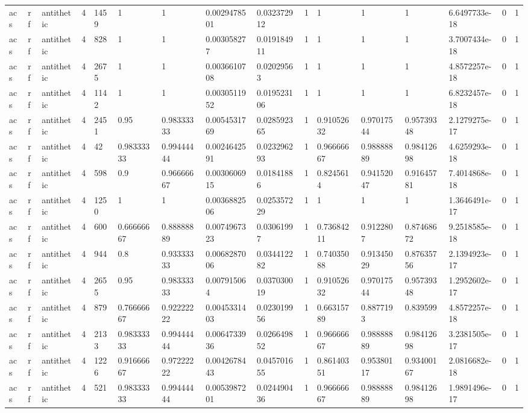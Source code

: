 \begin{tabular}{llllllllllllllll}
acs & rf & antithetic & 4 & 1459 & 1 & 1 & 0.0029478501 & 0.032372912 & 1 & 1 & 1 & 1 & 6.6497733e-18 & 0 & 1 \\
acs & rf & antithetic & 4 & 828 & 1 & 1 & 0.003058277 & 0.019184911 & 1 & 1 & 1 & 1 & 3.7007434e-18 & 0 & 1 \\
acs & rf & antithetic & 4 & 2675 & 1 & 1 & 0.0036610708 & 0.02029563 & 1 & 1 & 1 & 1 & 4.8572257e-18 & 0 & 1 \\
acs & rf & antithetic & 4 & 1142 & 1 & 1 & 0.0030511952 & 0.019523106 & 1 & 1 & 1 & 1 & 6.8232457e-18 & 0 & 1 \\
acs & rf & antithetic & 4 & 2451 & 0.95 & 0.98333333 & 0.0054531769 & 0.028592365 & 1 & 0.91052632 & 0.97017544 & 0.95739348 & 2.1279275e-17 & 0 & 1 \\
acs & rf & antithetic & 4 & 42 & 0.98333333 & 0.99444444 & 0.0024642591 & 0.023296293 & 1 & 0.96666667 & 0.98888889 & 0.98412698 & 4.6259293e-18 & 0 & 1 \\
acs & rf & antithetic & 4 & 598 & 0.9 & 0.96666667 & 0.0030606915 & 0.01841886 & 1 & 0.8245614 & 0.94152047 & 0.91645781 & 7.4014868e-18 & 0 & 1 \\
acs & rf & antithetic & 4 & 1250 & 1 & 1 & 0.0036882506 & 0.025357229 & 1 & 1 & 1 & 1 & 1.3646491e-17 & 0 & 1 \\
acs & rf & antithetic & 4 & 600 & 0.66666667 & 0.88888889 & 0.0074967323 & 0.03061997 & 1 & 0.73684211 & 0.9122807 & 0.87468672 & 9.2518585e-18 & 0 & 1 \\
acs & rf & antithetic & 4 & 944 & 0.8 & 0.93333333 & 0.0068287006 & 0.034412282 & 1 & 0.74035088 & 0.91345029 & 0.87635756 & 2.1394923e-17 & 0 & 1 \\
acs & rf & antithetic & 4 & 2655 & 0.95 & 0.98333333 & 0.007915064 & 0.037030019 & 1 & 0.91052632 & 0.97017544 & 0.95739348 & 1.2952602e-17 & 0 & 1 \\
acs & rf & antithetic & 4 & 879 & 0.76666667 & 0.92222222 & 0.0045331403 & 0.023019956 & 1 & 0.66315789 & 0.8877193 & 0.839599 & 4.8572257e-18 & 0 & 1 \\
acs & rf & antithetic & 4 & 2133 & 0.98333333 & 0.99444444 & 0.0064733936 & 0.026649852 & 1 & 0.96666667 & 0.98888889 & 0.98412698 & 3.2381505e-17 & 0 & 1 \\
acs & rf & antithetic & 4 & 1226 & 0.91666667 & 0.97222222 & 0.0042678443 & 0.045701655 & 1 & 0.86140351 & 0.95380117 & 0.93400167 & 2.0816682e-18 & 0 & 1 \\
acs & rf & antithetic & 4 & 521 & 0.98333333 & 0.99444444 & 0.0053987201 & 0.024490436 & 1 & 0.96666667 & 0.98888889 & 0.98412698 & 1.9891496e-17 & 0 & 1 \\

\end{tabular}
